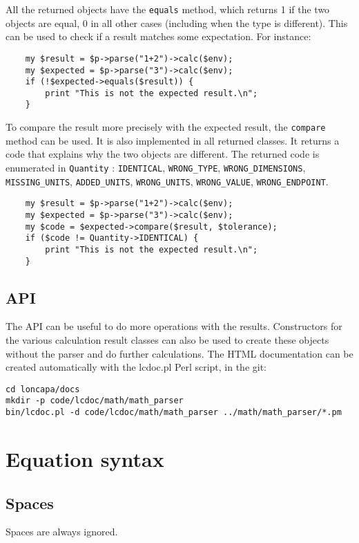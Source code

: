 All the returned objects have the \texttt{equals} method, which returns 1 if the two objects are equal, 0 in all other cases (including when the type is different). This can be used to check if a result matches some expectation. For instance:
\begin{verbatim}
    my $result = $p->parse("1+2")->calc($env);
    my $expected = $p->parse("3")->calc($env);
    if (!$expected->equals($result)) {
        print "This is not the expected result.\n";
    }
\end{verbatim}

To compare the result more precisely with the expected result, the \texttt{compare} method can be used. It is also implemented in all returned classes. It returns a code that explains why the two objects are different. The returned code is enumerated in \texttt{Quantity} : \texttt{IDENTICAL}, \texttt{WRONG\_TYPE}, \texttt{WRONG\_DIMENSIONS}, \texttt{MISSING\_UNITS}, \texttt{ADDED\_UNITS}, \texttt{WRONG\_UNITS}, \texttt{WRONG\_VALUE}, \texttt{WRONG\_ENDPOINT}.
\begin{verbatim}
    my $result = $p->parse("1+2")->calc($env);
    my $expected = $p->parse("3")->calc($env);
    my $code = $expected->compare($result, $tolerance);
    if ($code != Quantity->IDENTICAL) {
        print "This is not the expected result.\n";
    }
\end{verbatim}

\subsection{API}
The API can be useful to do more operations with the results. Constructors for the various calculation result classes can also be used to create these objects without the parser and do further calculations.
The HTML documentation can be created automatically with the lcdoc.pl Perl script, in the git:
\begin{verbatim}
cd loncapa/docs
mkdir -p code/lcdoc/math/math_parser
bin/lcdoc.pl -d code/lcdoc/math/math_parser ../math/math_parser/*.pm
\end{verbatim}


\section{Equation syntax}

\subsection{Spaces}
Spaces are always ignored.

